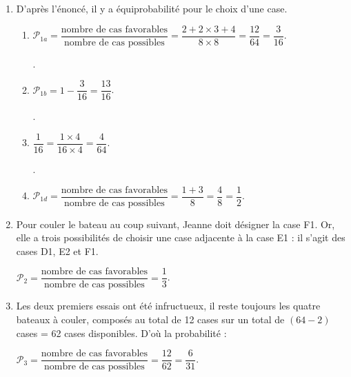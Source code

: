 \begin{enumerate}
    \item D'après l'énoncé, il y a équiprobabilité pour le choix d'une case.
       \begin{enumerate}
          \item $\mathcal{P}_{1a} =\dfrac{\text{nombre de cas favorables}}{\text{nombre de cas possibles}} =\dfrac{2+2\times3+4}{8\times8} =\dfrac{12}{64} =\dfrac{3}{16}$. \par
             .
          \item $\mathcal{P}_{1b} =1-\dfrac{3}{16} =\dfrac{13}{16}$. \par \smallskip
             .
          \item $\dfrac{1}{16} =\dfrac{1\times4}{16\times4} =\dfrac{4}{64}$. \par \smallskip
             .
          \item $\mathcal{P}_{1d} =\dfrac{\text{nombre de cas favorables}}{\text{nombre de cas possibles}} =\dfrac{1+3}{8} =\dfrac48 =\dfrac12$. \par \smallskip
       \end{enumerate}
    \item Pour couler le bateau au coup suivant, Jeanne doit désigner la case F1. Or, elle a trois possibilités de choisir une case adjacente à la case E1 : il s'agit des cases D1, E2 et F1. \par
       $\mathcal{P}_{2} =\dfrac{\text{nombre de cas favorables}}{\text{nombre de cas possibles}} =\dfrac13$. \par
    \item Les deux premiers essais ont été infructueux, il reste toujours les quatre bateaux à couler, composés au total de 12 cases sur un total de $(64-2)$ cases = 62 cases disponibles. D'où la probabilité : \par
       $\mathcal{P}_{3} =\dfrac{\text{nombre de cas favorables}}{\text{nombre de cas possibles}} =\dfrac{12}{62} =\dfrac{6}{31}$. \par \vskip-1mm
 \end{enumerate}